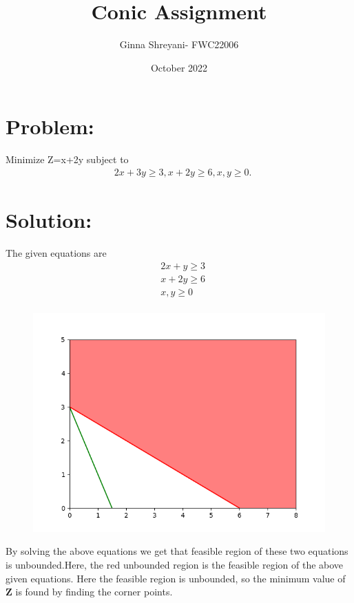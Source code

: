\documentclass[a4paper,12pt,twocolumn]{article}
\title{Conic Assignment}
\author{Ginna Shreyani- FWC22006}
\date{October 2022}
\let\vec\mathbf
\begin{document}
\maketitle											
\section{Problem:}
Minimize Z=x+2y subject to
\begin{align*}
&2x+3y\ge3,x+2y\ge6,x,y\ge0.
\end{align*}
\maketitle
\section{Solution:}
The given equations are
\begin{align*}
&2x+y\ge3\\
&x+2y\ge6\\
&x,y\ge0\\
\end{align*}
\begin{figure}[h]
     \includegraphics[width=\linewidth]{figures/optimize.png}
\end{figure}
By solving the above equations we get that feasible region of  these two equations is unbounded.Here, the red unbounded region is the feasible region of the above given equations. Here the feasible region is unbounded, so the minimum value of $\vec{Z}$ is found by finding the corner points.\\
\end{document}
